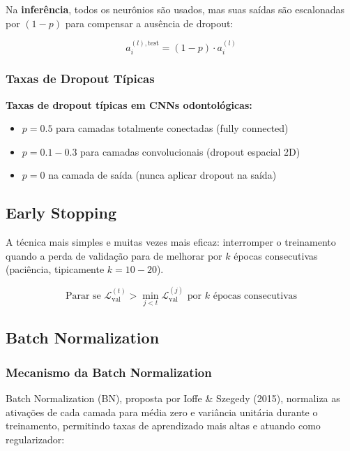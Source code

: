 Na \textbf{inferência}, todos os neurônios são usados, mas suas saídas são
escalonadas por $(1-p)$ para compensar a ausência de dropout:

\begin{equation}
  a_i^{(l),\text{test}} = (1-p) \cdot a_i^{(l)}
  \label{eq:dropout-test}
\end{equation}

\subsubsection{Taxas de Dropout Típicas}

\textbf{Taxas de dropout típicas em CNNs odontológicas:}
\begin{itemize}
  \item $p=0.5$ para camadas totalmente conectadas (fully connected)
  \item $p=0.1-0.3$ para camadas convolucionais (dropout espacial 2D)
  \item $p=0$ na camada de saída (nunca aplicar dropout na saída)
\end{itemize}

\subsection{Early Stopping}

A técnica mais simples e muitas vezes mais eficaz: interromper o treinamento
quando a perda de validação para de melhorar por $k$ épocas consecutivas
(paciência, tipicamente $k=10-20$).

\begin{equation}
  \text{Parar se } \mathcal{L}_{\text{val}}^{(t)} > \min_{j < t} \mathcal{L}_{\text{val}}^{(j)}
  \text{ por } k \text{ épocas consecutivas}
  \label{eq:early-stopping}
\end{equation}

\subsection{Batch Normalization}

\subsubsection{Mecanismo da Batch Normalization}

Batch Normalization (BN), proposta por Ioffe \& Szegedy (2015), normaliza as
ativações de cada camada para média zero e variância unitária durante o treinamento,
permitindo taxas de aprendizado mais altas e atuando como regularizador:

